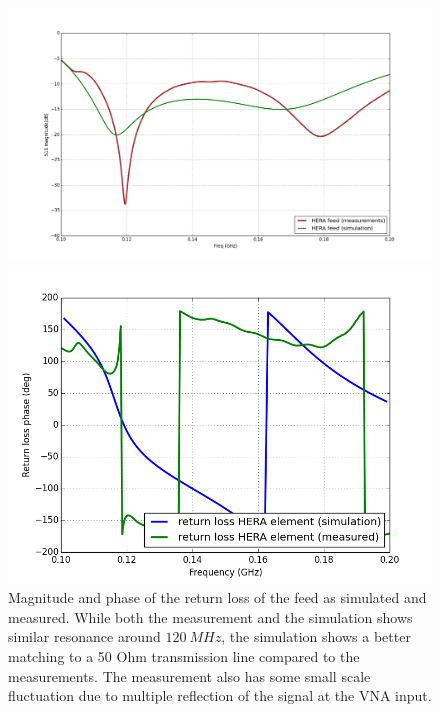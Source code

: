 \documentclass[twocolumn]{emulateapj}
\begin{document}
\begin{figure}[ht]
\begin{minipage}[b]{\linewidth}
\centering
\includegraphics[angle=0, width=\linewidth]{GB_reflectometry_part3/plot/RL_mag_feed.png}
\end{minipage}
\vspace{0.1cm}
\begin{minipage}[b]{\linewidth}
\centering
\includegraphics[angle=0, width=\linewidth]{plots/feed_meas_sim_ph.png}
\end{minipage}
\caption{Magnitude and phase of the return loss of the feed as simulated and measured. While both the measurement and the simulation shows similar resonance around $120~MHz$, the simulation shows a better matching to a 50 Ohm transmission line compared to the measurements. The measurement also has some small scale fluctuation due to multiple reflection of the signal at the VNA input. }   
\label{RL_mag_feed}
\end{figure}
\end{document}
